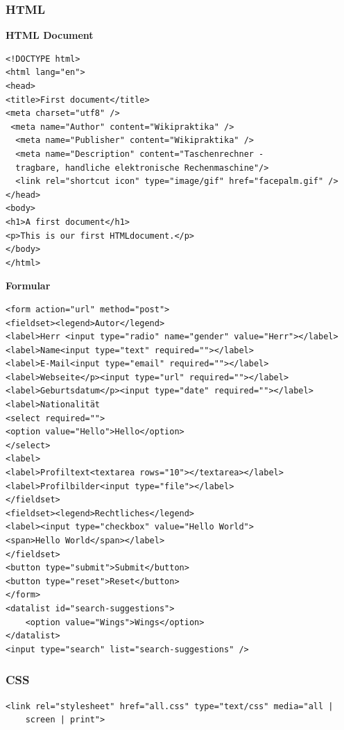 

\thispagestyle{fancy}
\raggedright
\footnotesize
\raggedcolumns
\begin{multicols*}{4}
\setlength{\premulticols}{1pt}
\setlength{\postmulticols}{1pt}
\setlength{\multicolsep}{1pt}
\setlength{\columnsep}{2pt}
\tiny

\subsubsection{HTML}

\textbf{HTML Document}
 \begin{verbatim}
<!DOCTYPE html>
<html lang="en"> 
<head>
<title>First document</title>
<meta charset="utf­8" /> 
 <meta name="Author" content="Wikipraktika" />
  <meta name="Publisher" content="Wikipraktika" />
  <meta name="Description" content="Taschenrechner - 
  tragbare, handliche elektronische Rechenmaschine"/>
  <link rel="shortcut icon" type="image/gif" href="facepalm.gif" />
</head>
<body>
<h1>A first document</h1>
<p>This is our first HTML­document.</p> 
</body>
</html>
\end{verbatim}

\textbf{Formular}
 \begin{verbatim}
<form action="url" method="post">
<fieldset><legend>Autor</legend>
<label>Herr <input type="radio" name="gender" value="Herr"></label>
<label>Name<input type="text" required=""></label>
<label>E-Mail<input type="email" required=""></label>
<label>Webseite</p><input type="url" required=""></label>
<label>Geburtsdatum</p><input type="date" required=""></label>
<label>Nationalität
<select required="">
<option value="Hello">Hello</option>
</select>
<label>
<label>Profiltext<textarea rows="10"></textarea></label>
<label>Profilbilder<input type="file"></label>
</fieldset>
<fieldset><legend>Rechtliches</legend>
<label><input type="checkbox" value="Hello World">
<span>Hello World</span></label>
</fieldset>
<button type="submit">Submit</button>
<button type="reset">Reset</button>
</form>
<datalist id="search-suggestions">
	<option value="Wings">Wings</option>
</datalist>
<input type="search" list="search-suggestions" />
\end{verbatim}

\subsubsection{CSS}
 \begin{verbatim}
<link rel="stylesheet" href="all.css" type="text/css" media="all | 
    screen | print">
 \end{verbatim}
 

\end{multicols*}
